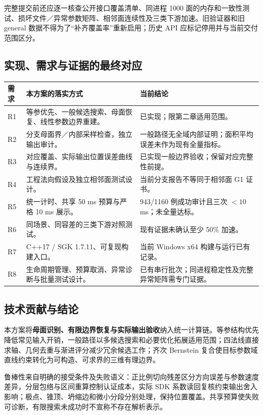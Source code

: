 \documentclass[UTF8,zihao=5,fontset=windows,a4paper]{ctexart}
\begin{document}
完整提交前还应逐一核查公开接口覆盖清单、同进程 1000 面的内存和一致性测试、损坏文件／异常参数矩阵、相邻面连续性及三类下游加速。旧验证器和旧 general 数据不得为了“补齐覆盖率”重新启用；历史 API 应标记停用并与当前交付范围区分。

\newpage
\subsection{实现、需求与证据的最终对应}
\begin{center}\small\renewcommand{\arraystretch}{1.2}
\begin{tabularx}{\linewidth}{@{}p{14mm}Yp{40mm}@{}}\toprule
需求 & 本方案的落实方式 & 当前结论\\\midrule
R1 & 等参优先、一般候选搜索、母面恢复、线性参数边界重建。 & 已实现；限第二章适用范围。\\
R2 & 分支母面界／内部采样检查，独立输出审计。 & 一般路径无全域内部证明；面积平均误差未作为现有全量指标。\\
R3 & 对应覆盖、实际输出位置误差曲线与连续界。 & 已实现一般边界验收；保留对应完整性前提。\\
R4 & 工程法向假设及独立相邻面测试设计。 & 当前分支报告不等同于相邻面 G1 证书。\\
R5 & 统一计时、共享 50 ms 预算与严格 10 ms 展示。 & 943/1160 例成功审计且三次 $<10$ ms；未全量达标。\\
R6 & 同场景、同容差的三类下游对照测试。 & 现有证据未确认至少 50\% 加速。\\
R7 & C++17 / SGK 1.7.11、可复现构建入口。 & 当前 Windows x64 构建与运行已有记录。\\
R8 & 生命周期管理、预算取消、异常诊断与批量测试设计。 & 已有串行批次；同进程稳定性及完整异常矩阵需专门证据。\\\bottomrule
\end{tabularx}
\end{center}

\subsection{技术贡献与结论}
本方案将\textbf{母面识别、有限边界恢复与实际输出验收}纳入统一计算链。等参结构优先降低常见输入开销，一般路径以多候选搜索和必要优化拓展适用范围；四法线直接求轴、几何去重与渐进评分减少冗余候选工作；齐次 Bernstein 复合使目标参数域直线约束转化为可构造、可求界的三维有理边界。

鲁棒性来自明确的接受条件及失败语义：正比例切向残差区分方向误差与参数速度差异，分层包络与区间重算控制认证成本，实际 SDK 系数读回复核约束输出舍入影响；极点、锥顶、坍缩边和微小分段分别处理，保持位置覆盖。共享预算使失败可诊断，有限搜索未成功时不宣称不存在解析表示。
\end{document}
